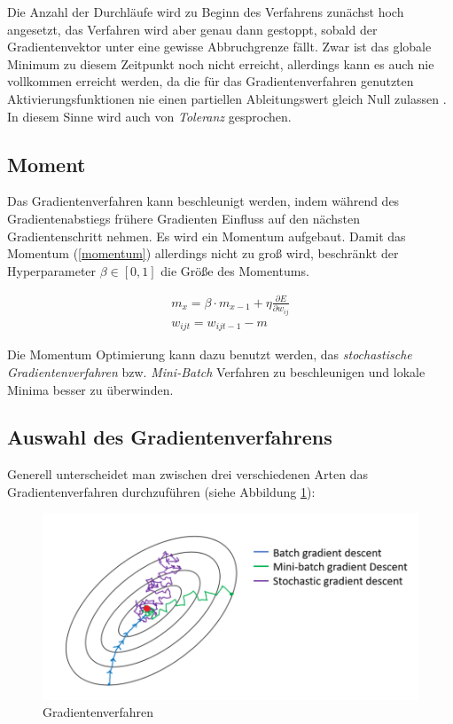 Die Anzahl der Durchläufe wird zu Beginn des Verfahrens zunächst hoch angesetzt, das Verfahren wird aber genau dann gestoppt, sobald der Gradientenvektor unter eine gewisse Abbruchgrenze fällt. Zwar ist das globale Minimum zu diesem Zeitpunkt noch nicht erreicht, allerdings kann es auch nie vollkommen erreicht werden, da die für das Gradientenverfahren genutzten Aktivierungsfunktionen nie einen partiellen Ableitungswert gleich Null zulassen \cite{AurelienGeron.2018}. In diesem Sinne wird auch von \textit{Toleranz} gesprochen.

\subsection*{Moment}

Das Gradientenverfahren kann beschleunigt werden, indem während des Gradientenabstiegs frühere Gradienten Einfluss auf den nächsten Gradientenschritt nehmen. Es wird ein \glqq Momentum\grqq{} aufgebaut. Damit das Momentum (\ref{momentum}) allerdings nicht zu groß wird, beschränkt der Hyperparameter $\beta \in [0,1]$ die Größe des Momentums. \cite{AurelienGeron.2018}

\begin{equation} \label{momentum}
\begin{split}
m_x = \beta \cdot m_{x-1} + \eta\frac{\partial E}{\partial w_{ij}} \\
w_{ijt} = w_{ijt-1} - m 
\end{split}
\end{equation}

Die Momentum Optimierung kann dazu benutzt werden, das \textit{stochastische Gradientenverfahren} bzw. \textit{Mini-Batch} Verfahren zu beschleunigen und lokale Minima besser zu überwinden.

\subsection*{Auswahl des Gradientenverfahrens}

Generell unterscheidet man zwischen drei verschiedenen Arten das Gradientenverfahren durchzuführen (siehe Abbildung \ref{gradient}):

\begin{figure}[ht]
	\begin{center}
		\includegraphics[width=15cm]{Bilder/gradient_descent.png} 
		\caption[Gradientenverfahren]{Gradientenverfahren \cite{ImadDabbura.20171221}}
		\label{gradient}
	\end{center}
\end{figure}

